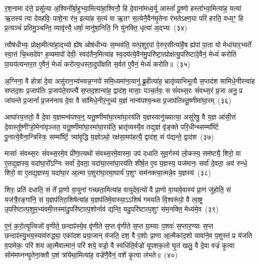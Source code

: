 र॒श॒नामा द॑त्ते॒ प्रसू᳚त्या अ॒श्विनो᳚र्बा॒हुभ्या॒मित्या॑हा॒श्विनौ॒ हि दे॒वाना॑मध्व॒र्यू आस्तां᳚ पू॒ष्णो हस्ता᳚भ्या॒मित्या॑ह॒ यत्या॑ ऋ॒तस्य॑ त्वा देवहविः॒ पाशे॒ना र॑भ॒ इत्या॑ह स॒त्यं वा ऋ॒तꣳ स॒त्येनै॒वैन॑मृ॒तेना र॑भते\-ऽक्ष्ण॒या परि॑ हरति॒ वध्य॒ꣳ॒ हि प्र॒त्यञ्चं॑ प्रतिमु॒ञ्चन्ति॒ व्यावृ॑त्त्यै॒ धर्\mbox{}षा॒ मानु॑षा॒निति॒ नि यु॑नक्ति॒ धृत्या॑ अ॒द्भ्यः~(३४)

त्वौष॑धीभ्यः॒ प्रोक्षा॒मीत्या॑हा॒द्भ्यो ह्ये॑ष ओष॑धीभ्यः स॒म्भव॑ति॒ यत्प॒शुर॒पां पे॒रुर॒सीत्या॑है॒ष ह्य॑पां पा॒ता यो मेधा॑यार॒भ्यते᳚ स्वा॒त्तं चि॒थ्सदे॑वꣳ ह॒व्यमापो॑ देवीः॒ स्वद॑तैन॒मित्या॑ह स्व॒दय॑त्ये॒वैन॑मु॒परि॑ष्टा॒त्प्रोक्ष॑त्यु॒परि॑ष्टादे॒वैनं॒ मेध्यं॑ करोति पा॒यय॑त्यन्तर॒त ए॒वैनं॒ मेध्यं॑ करोत्य॒धस्ता॒दुपो᳚क्षति स॒र्वत॑ ए॒वैनं॒ मेध्यं॑ करोति॥~(३५)

{\anuvakamend[{वसू॒निति॑ प्रस॒व इत्य॒द्भ्यो᳚\-ऽन्तर॒त ए॒वैन॒न्दश॑ च}]}%

अ॒ग्निना॒ वै होत्रा॑ दे॒वा असु॑रान॒भ्य॑भवन्न॒ग्नये॑ समि॒ध्यमा॑ना॒यानु॑ ब्रू॒हीत्या॑ह॒ भ्रातृ॑व्याभिभूत्यै स॒प्तद॑श सामिधे॒नीरन्वा॑ह सप्तद॒शः प्र॒जा\-प॑तिः प्र॒जा\-प॑ते॒राप्त्यै॑ स॒प्तद॒शान्वा॑ह॒ द्वाद॑श॒ मासाः॒ पञ्च॒र्तवः॒ स सं॑वथ्स॒रः सं॑वथ्स॒रं प्र॒जा अनु॒ प्र जा॑यन्ते प्र॒जानां᳚ प्र॒जन॑नाय दे॒वा वै सा॑मिधे॒नीर॒नूच्य॑ य॒ज्ञं नान्व॑पश्य॒न्थ्स प्र॒जा\-प॑तिस्तू॒ष्णीमा॑घा॒रम्~(३६)

आघा॑रय॒त्ततो॒ वै दे॒वा य॒ज्ञमन्व॑पश्य॒न्॒ यत्तू॒ष्णीमा॑घा॒रमा॑घा॒रय॑ति य॒ज्ञस्यानु॑ख्यात्या॒ असु॑रेषु॒ वै य॒ज्ञ आ॑सी॒त्तं दे॒वास्तू᳚ष्णीꣳहो॒मेना॑वृञ्जत॒ यत्तू॒ष्णीमा॑घा॒रमा॑घा॒रय॑ति॒ भ्रातृ॑व्यस्यै॒व तद्य॒ज्ञं वृ॑ङ्क्ते परि॒धीन्थ्सम्मा᳚र्ष्टि पु॒नात्ये॒वैना॒न्त्रिस्त्रिः॒ सम्मा᳚र्ष्टि॒ त्र्या॑वृ॒द्धि य॒ज्ञो\-ऽथो॒ रक्ष॑सा॒मप॑हत्यै॒ द्वाद॑श॒ सं प॑द्यन्ते॒ द्वाद॑श~(३७)

मासाः᳚ संवथ्स॒रः सं॑वथ्स॒रमे॒व प्री॑णा॒त्यथो॑ संवथ्स॒रमे॒वास्मा॒ उप॑ दधाति सुव॒र्गस्य॑ लो॒कस्य॒ सम॑ष्ट्यै॒ शिरो॒ वा ए॒तद्य॒ज्ञस्य॒ यदा॑घा॒रो᳚\-ऽग्निः सर्वा॑ दे॒वता॒ यदा॑घा॒रमा॑घा॒रय॑ति शीर्\mbox{}ष॒त ए॒व य॒ज्ञस्य॒ यज॑मानः॒ सर्वा॑ दे॒वता॒ अव॑ रुन्धे॒ शिरो॒ वा ए॒तद्य॒ज्ञस्य॒ यदा॑घा॒र आ॒त्मा प॒शुरा॑घा॒रमा॒घार्य॑ प॒शुꣳ सम॑नक्त्या॒त्मन्ने॒व य॒ज्ञस्य॑~(३८)

शिरः॒ प्रति॑ दधाति॒ सं ते᳚ प्रा॒णो वा॒युना॑ गच्छता॒मित्या॑ह वायुदेव॒त्यो॑ वै प्रा॒णो वा॒यावे॒वास्य॑ प्रा॒णं जु॑होति॒ सं यज॑त्रै॒रङ्गा॑नि॒ सं य॒ज्ञप॑तिरा॒शिषेत्या॑ह य॒ज्ञप॑तिमे॒वास्या॒\-ऽऽ\-शिषं॑ गमयति वि॒श्वरू॑पो॒ वै त्वा॒ष्ट्र उ॒परि॑ष्टात्प॒शुम॒भ्य॑वमी॒त्तस्मा॑दु॒परि॑ष्टात्प॒शोर्नाव॑ द्यन्ति॒ यदु॒परि॑ष्टात्प॒शुꣳ स॑म॒नक्ति॒ मेध्य॑मे॒व~(३९)

ए॒नं॒ क॒रो॒त्यृ॒त्विजो॑ वृणीते॒ छन्दाꣴ॑स्ये॒व वृ॑णीते स॒प्त वृ॑णीते स॒प्त ग्रा॒म्याः प॒शवः॑ स॒प्तार॒ण्याः स॒प्त छन्दाꣴ॑स्यु॒भय॒स्याव॑रुद्ध्या॒ एका॑\-दश प्रया॒जान् य॑जति॒ दश॒ वै प॒शोः प्रा॒णा आ॒त्मैका॑द॒शो यावा॑ने॒व प॒शुस्तं प्र य॑जति व॒पामेकः॒ परि॑ शय आ॒त्मैवात्मानं॒ परि॑ शये॒ वज्रो॒ वै स्वधि॑ति॒र्वज्रो॑ यूपशक॒लो घृ॒तं खलु॒ वै दे॒वा वज्रं॑ कृ॒त्वा सोम॑मघ्नन्घृ॒तेना॒क्तौ प॒शं त्रा॑येथा॒मित्या॑ह॒ वज्रे॑णै॒वैनं॒ वशे॑ कृ॒त्वा ल॑भते॥~(४०)

